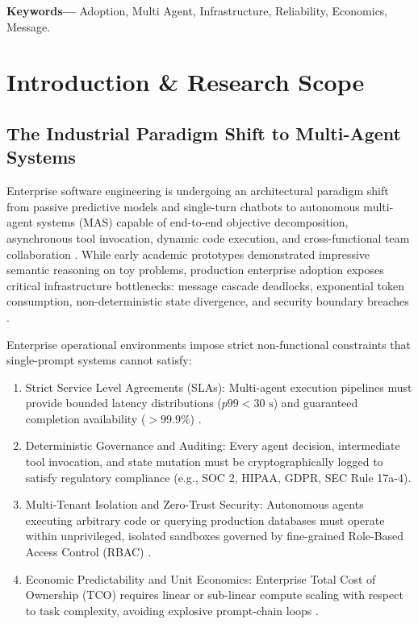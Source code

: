 \documentclass[10pt,journal,compsoc,twocolumn]{IEEEtran}
\begin{document}
\noindent\textbf{Keywords---} Adoption, Multi Agent, Infrastructure, Reliability, Economics, Message.







\section{Introduction \& Research Scope}



\subsection{The Industrial Paradigm Shift to Multi-Agent Systems}


Enterprise software engineering is undergoing an architectural paradigm shift from passive predictive models and single-turn chatbots to autonomous multi-agent systems (MAS) capable of end-to-end objective decomposition, asynchronous tool invocation, dynamic code execution, and cross-functional team collaboration \cite{arxiv_2405_01543,arxiv_2005_14165}. While early academic prototypes demonstrated impressive semantic reasoning on toy problems, production enterprise adoption exposes critical infrastructure bottlenecks: message cascade deadlocks, exponential token consumption, non-deterministic state divergence, and security boundary breaches \cite{arxiv_2404_04289,crossref_10_1016_j_aei_2026_104392}.

Enterprise operational environments impose strict non-functional constraints that single-prompt systems cannot satisfy:
\begin{enumerate}
  \item Strict Service Level Agreements (SLAs): Multi-agent execution pipelines must provide bounded latency distributions ($p99 < 30\text{ s}$) and guaranteed completion availability ($>99.9\%$) \cite{crossref_10_1108_jeim_12_2025_1269}.
  \item Deterministic Governance and Auditing: Every agent decision, intermediate tool invocation, and state mutation must be cryptographically logged to satisfy regulatory compliance (e.g., SOC 2, HIPAA, GDPR, SEC Rule 17a-4).
  \item Multi-Tenant Isolation and Zero-Trust Security: Autonomous agents executing arbitrary code or querying production databases must operate within unprivileged, isolated sandboxes governed by fine-grained Role-Based Access Control (RBAC) \cite{arxiv_2404_04289,doaj_001772c2113c476d9d5d40452c8e10e1}.
  \item Economic Predictability and Unit Economics: Enterprise Total Cost of Ownership (TCO) requires linear or sub-linear compute scaling with respect to task complexity, avoiding explosive prompt-chain loops \cite{arxiv_2406_00584}.
\end{enumerate}
\end{document}

